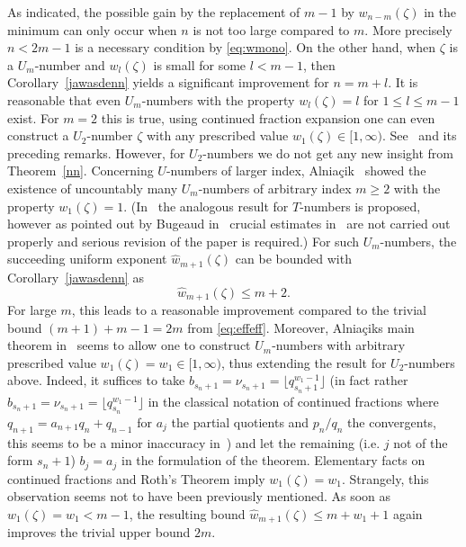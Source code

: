 \documentclass[12pt]{amsart}
\theoremstyle{definition}
\begin{document}
As indicated, the possible gain by the replacement of $m-1$ by $w_{n-m}(\zeta)$ in the minimum can only
occur when $n$ is not too large compared to $m$. More precisely $n<2m-1$ is a necessary condition by \eqref{eq:wmono}.
On the other hand, when $\zeta$ is a $U_{m}$-number and $w_{l}(\zeta)$ is small for 
some $l<m-1$, then Corollary~\ref{jawasdenn} yields a significant improvement for $n=m+l$. 
It is reasonable that even $U_{m}$-numbers with the property 
$w_{l}(\zeta)=l$ for $1\leq l\leq m-1$ exist. For $m=2$ this is true, using continued
fraction expansion one can even construct a $U_{2}$-number $\zeta$ with any prescribed value $w_{1}(\zeta)\in[1,\infty)$.
See~\cite[Theorem~7.6]{bugbuch} and its preceding remarks. However, for $U_{2}$-numbers we do not get any new
insight from Theorem~\ref{nn}. 
Concerning $U$-numbers of larger index, Alnia\c{c}ik~\cite{aln}
showed the existence of uncountably many $U_{m}$-numbers of arbitrary index $m\geq 2$ with the property $w_{1}(\zeta)=1$.
(In~\cite{alni2} the analogous result 
for $T$-numbers is proposed, 
however as pointed out by
Bugeaud in~\cite[Section~7.10]{bugbuch} crucial
estimates in~\cite{alni2} are not carried out properly
and serious revision of the paper is required.)          
For such $U_{m}$-numbers, the succeeding uniform 
exponent $\widehat{w}_{m+1}(\zeta)$ can
be bounded with Corollary~\ref{jawasdenn} as
\[
\widehat{w}_{m+1}(\zeta)\leq m+2.
\]
For large $m$, this leads to a reasonable improvement compared to the trivial bound $(m+1)+m-1=2m$ from \eqref{eq:effeff}. 
Moreover, Alnia\c{c}iks main theorem in~\cite{aln} seems to allow one to construct $U_{m}$-numbers  
with arbitrary prescribed value $w_{1}(\zeta)=w_{1}\in[1,\infty)$, thus extending the result        
for $U_{2}$-numbers above. Indeed, it suffices to take                                                  
$b_{s_{n}+1}=\nu_{s_{n}+1}=\lfloor q_{s_{n}+1}^{w_{1}-1}\rfloor$                                        
(in fact rather $b_{s_{n}+1}=\nu_{s_{n}+1}=\lfloor q_{s_{n}}^{w_{1}-1}\rfloor$ in the  
classical notation of continued fractions where $q_{n+1}=a_{n+1}q_{n}+q_{n-1}$ for $a_{j}$   
the partial quotients and $p_{n}/q_{n}$ the convergents, this seems to be a minor inaccuracy in~\cite{aln})  
and let the remaining (i.e. $j$ not of the form $s_{n}+1$) $b_{j}=a_{j}$ in the formulation of the theorem. 
Elementary facts on continued fractions and Roth's Theorem imply $w_{1}(\zeta)= w_{1}$.   
Strangely, this observation seems not to have been 
previously mentioned.                          
As soon as $w_{1}(\zeta)=w_{1}<m-1$, the resulting bound                                                 
$\widehat{w}_{m+1}(\zeta)\leq m+w_{1}+1$                                                                 
again improves the trivial upper bound $2m$.                                                             
\end{document}
